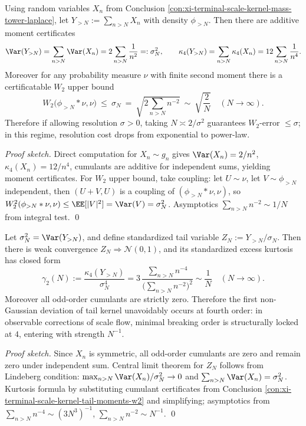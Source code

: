 \begin{conclusion}\label{con:xi-terminal-scale-kernel-tail-moments-w2}
Using random variables \(X_n\) from Conclusion \ref{con:xi-terminal-scale-kernel-mass-tower-laplace}, let \(Y_{>N}:=\sum_{n>N}X_n\) with density \(\phi_{>N}\).
Then there are additive moment certificates
\[
\Var(Y_{>N})=\sum_{n>N}\Var(X_n)=2\sum_{n>N}\frac{1}{n^2}=: \sigma_N^2,
\qquad
\kappa_4(Y_{>N})=\sum_{n>N}\kappa_4(X_n)=12\sum_{n>N}\frac{1}{n^4}.
\]
Moreover for any probability measure \(\nu\) with finite second moment there is a certificatable \(W_2\) upper bound
\[
\boxed{\;
W_2\bigl(\phi_{>N}*\nu,\nu\bigr)\ \le\ \sigma_N
\ =\ \sqrt{2\sum_{n>N}n^{-2}}
\ \sim\ \sqrt{\frac{2}{N}}\quad(N\to\infty).\;}
\]
Therefore if allowing resolution \(\sigma>0\), taking \(N\asymp 2/\sigma^{2}\) guarantees \(W_2\)-error \(\le \sigma\);
in this regime, resolution cost drops from exponential to power-law.
\end{conclusion}
\begin{proof}[Proof sketch]
Direct computation for \(X_n\sim g_n\) gives \(\Var(X_n)=2/n^2\), \(\kappa_4(X_n)=12/n^4\), cumulants are additive for independent sums, yielding moment certificates.
For \(W_2\) upper bound, take coupling: let \(U\sim \nu\), let \(V\sim \phi_{>N}\) independent, then \((U+V,U)\) is a coupling of \((\phi_{>N}*\nu,\nu)\), so
\(
W_2^2(\phi_{>N}*\nu,\nu)\le \EE[|V|^2]=\Var(V)=\sigma_N^2
\).
Asymptotics \(\sum_{n>N}n^{-2}\sim 1/N\) from integral test. \qed
\end{proof}

\begin{conclusion}[Gaussianization of tail kernel and fourth-order first breaking: non-Gaussianity uniquely dominated by \texorpdfstring{$q=4$}{q=4} magnitude]\label{con:xi-terminal-scale-kernel-tail-gaussianization-kurtosis}
Let \(\sigma_N^2=\Var(Y_{>N})\), and define standardized tail variable \(Z_N:=Y_{>N}/\sigma_N\).
Then there is weak convergence \(Z_N\Rightarrow \mathcal N(0,1)\), and its standardized excess kurtosis has closed form
\[
\boxed{\;
\gamma_2(N):=\frac{\kappa_4(Y_{>N})}{\sigma_N^4}
=3\,\frac{\sum_{n>N}n^{-4}}{\bigl(\sum_{n>N}n^{-2}\bigr)^2}
\sim \frac{1}{N}\quad(N\to\infty).\;}
\]
Moreover all odd-order cumulants are strictly zero.
Therefore the first non-Gaussian deviation of tail kernel unavoidably occurs at fourth order: in observable corrections of scale flow, minimal breaking order is structurally locked at \(4\), entering with strength \(N^{-1}\).
\end{conclusion}
\begin{proof}[Proof sketch]
Since \(X_n\) is symmetric, all odd-order cumulants are zero and remain zero under independent sum.
Central limit theorem for \(Z_N\) follows from Lindeberg condition: \(\max_{n>N}\Var(X_n)/\sigma_N^2\to 0\) and \(\sum_{n>N}\Var(X_n)=\sigma_N^2\).
Kurtosis formula by substituting cumulant certificates from Conclusion \ref{con:xi-terminal-scale-kernel-tail-moments-w2} and simplifying;
asymptotics from \(\sum_{n>N}n^{-4}\sim (3N^3)^{-1}\), \(\sum_{n>N}n^{-2}\sim N^{-1}\). \qed
\end{proof}

